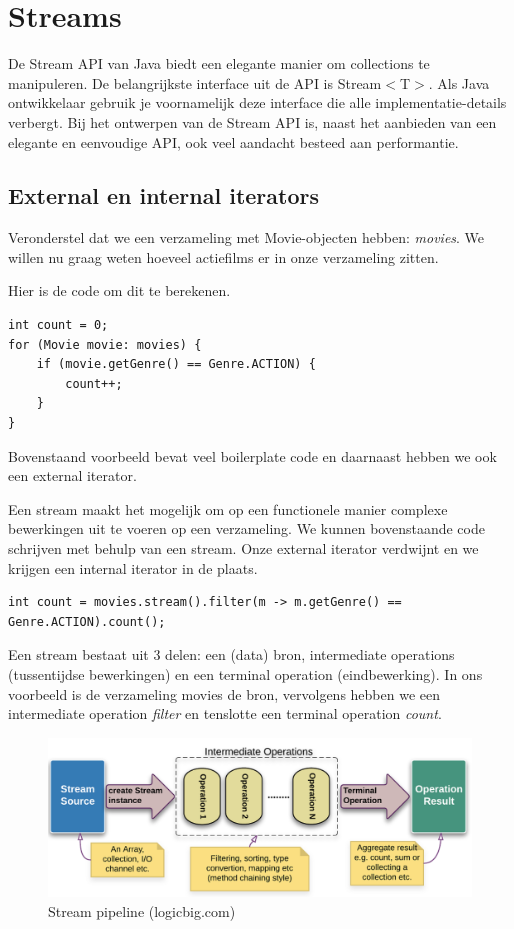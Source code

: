 \documentclass{tstextbook}
\begin{document}
\chapter{Streams}

\begin{summary}
De Stream API van Java biedt een elegante manier om collections te manipuleren. De belangrijkste interface uit de API is Stream$<$T$>$. Als Java ontwikkelaar gebruik je voornamelijk deze interface die alle implementatie-details verbergt. Bij het ontwerpen van de Stream API is, naast het aanbieden van een elegante en eenvoudige API, ook veel aandacht besteed aan performantie. 
\end{summary}

\section{External en internal iterators}

Veronderstel dat we een verzameling met Movie-objecten hebben: \textit{movies}. We willen nu graag weten hoeveel actiefilms er in onze verzameling zitten.

Hier is de code om dit te berekenen.

\begin{lstlisting}
int count = 0;
for (Movie movie: movies) {
    if (movie.getGenre() == Genre.ACTION) {
        count++;
    }
}
\end{lstlisting}

Bovenstaand voorbeeld bevat veel boilerplate code en daarnaast hebben we ook een external iterator. 

Een stream maakt het mogelijk om op een functionele manier complexe bewerkingen uit te voeren op een verzameling.
We kunnen bovenstaande code schrijven met behulp van een stream. Onze external iterator verdwijnt en we krijgen een internal iterator in de plaats.

\begin{lstlisting}
int count = movies.stream().filter(m -> m.getGenre() == Genre.ACTION).count();
\end{lstlisting}

Een stream bestaat uit 3 delen: een (data) bron, intermediate operations (tussentijdse bewerkingen) en een terminal operation (eindbewerking). In ons voorbeeld is de verzameling movies de bron, vervolgens hebben we een intermediate operation \textit{filter} en tenslotte een terminal operation \textit{count}.

\begin{figure}[H]
  \includegraphics[width=\linewidth]{images/h6/stream_pipeline.png}
  \caption{Stream pipeline (logicbig.com)}
  \label{fig:stream_of}
\end{figure}
\end{document}
